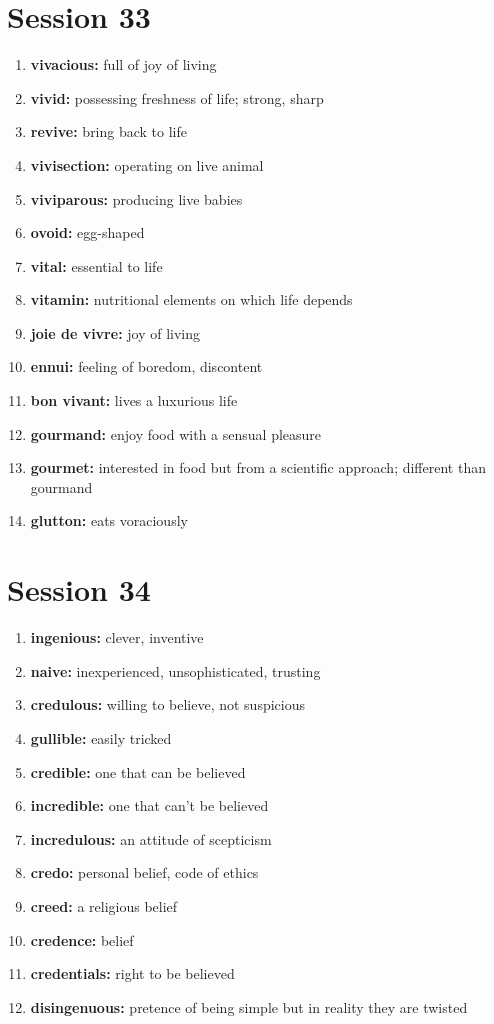 \documentclass{article}
\begin{document}
\section{Session 33}
\begin{enumerate}
    \item \textbf{vivacious: }{full of joy of living}
    \item \textbf{vivid: }{possessing freshness of life; strong, sharp}
    \item \textbf{revive: }{bring back to life}
    \item \textbf{vivisection: }{operating on live animal}
    \item \textbf{viviparous: }{producing live babies}
    \item \textbf{ovoid: }{egg-shaped}
    \item \textbf{vital: }{essential to life}
    \item \textbf{vitamin: }{nutritional elements on which life depends}
    \item \textbf{joie de vivre: }{joy of living}
    \item \textbf{ennui: }{feeling of boredom, discontent}
    \item \textbf{bon vivant: }{lives a luxurious life}
    \item \textbf{gourmand: }{enjoy food with a sensual pleasure}
    \item \textbf{gourmet: }{interested in food but from a scientific approach; different than gourmand}
    \item \textbf{glutton: }{eats voraciously}
    
\end{enumerate}

\section{Session 34}
\begin{enumerate}
    \item \textbf{ingenious: }{clever, inventive}
    \item \textbf{naive: }{inexperienced, unsophisticated, trusting}
    \item \textbf{credulous: }{willing to believe, not suspicious}
    \item \textbf{gullible: }{easily tricked}
    \item \textbf{credible: }{one that can be believed}
    \item \textbf{incredible: }{one that can't be believed}
    \item \textbf{incredulous: }{an attitude of scepticism}
    \item \textbf{credo: }{personal belief, code of ethics}
    \item \textbf{creed: }{a religious belief}
    \item \textbf{credence: }{belief}
    \item \textbf{credentials: }{right to be believed}
    \item \textbf{disingenuous: }{pretence of being simple but in reality they are twisted}
    
\end{enumerate}
\end{document}
